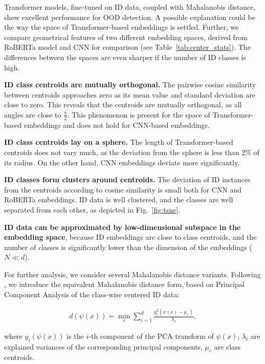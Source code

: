\documentclass[letterpaper, final]{article} %
\begin{document}
Transformer models, fine-tuned on ID data, coupled with Mahalanobis distance, show excellent performance for OOD detection. A possible explanation could be the way the space of Transformer-based embeddings is settled. Further, we compare geometrical features of two different embedding spaces, derived from RoBERTa model and CNN for comparison (see Table~\ref{tab:center_stats}). The differences between the spaces are even sharper if the number of ID classes is high.


{\bf ID class centroids are mutually orthogonal.}  The pairwise cosine similarity between centroids approaches zero as its mean value and standard deviation are close to zero. This reveals that the centroids are mutually orthogonal, as all angles are close to $\frac{\pi}2$. This phenomenon is present for the space of Transformer-based embeddings and does not hold for CNN-based embeddings.

{\bf ID class centroids lay on a sphere.} The length of Transformer-based centroids  does not vary much, as the deviation from the sphere is less than 2\% of its radius. On the other hand, CNN embeddings deviate more significantly.

{\bf ID classes form clusters around centroids.} The deviation of ID instances from the centroids according to cosine similarity is small both for CNN and RoBERTa embeddings. ID data is well clustered, and the classes are well separated from each other, as depicted in Fig.~\ref{fig:tsne}.


{\bf ID data can be approximated by low-dimensional subspace in the embedding space}, because ID embeddings are close to class centroids, and the number of classes is significantly lower than the dimension of the embeddings ($N \ll d$).

For further analysis, we consider several Mahalanobis distance variants. Following \citet*{Kamoi2020WhyIT}, we introduce the equivalent Mahalanobis distance form, based on  Principal Component Analysis of the class-wise centered ID data:


\begin{equation}
\begin{gathered}
d(\psi(x))=\min\limits_{c}\sum\limits_{i=1}^{d}\frac{y_i^2(\psi(x) - \mu_c)}{\lambda_i},
\end{gathered}
\label{eq:Maha_via_PCA}
\end{equation}

where $y_i(\psi(x))$ is the $i$-th component of the PCA transform of $\psi(x)$, $\lambda_i$ are explained variances of the corresponding principal components, $\mu_c$ are class centroids.
\end{document}
